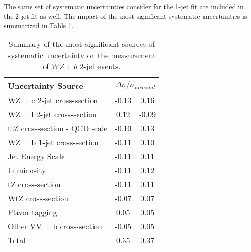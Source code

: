 


The same set of systematic uncertainties consider for the 1-jet fit are included in the 2-jet fit as well. The impact of the most significant systematic uncertainties is summarized in Table \ref{tab:systematics_2j}. 

\begin{table}[H]
    \centering
    \begin{tabular}{l|cc}
        \hline\hline
        Uncertainty Source & \multicolumn{2}{c}{$\Delta \sigma/\sigma_{nominal}$ }  \\
        \hline
        WZ + c 2-jet cross-section & -0.13 & 0.16 \\
        WZ + l 2-jet cross-section & 0.12 & -0.09 \\
        ttZ cross-section - QCD scale & -0.10 & 0.13 \\
        WZ + b 1-jet cross-section & -0.11 & 0.10 \\
        Jet Energy Scale & -0.11 & 0.11 \\
        Luminosity & -0.11 & 0.12 \\
        tZ cross-section & -0.11 & 0.11 \\
        WtZ cross-section & -0.07 & 0.07 \\
        Flavor tagging  & 0.05 & 0.05 \\
        Other VV + b cross-section & -0.05 & 0.05 \\
        \hline
        Total & 0.35 & 0.37 \\
        \hline\hline
    \end{tabular}
    \caption{Summary of the most significant sources of systematic uncertainty on the measurement of $WZ+b$ 2-jet events.}
    \label{tab:systematics_2j}
\end{table}

